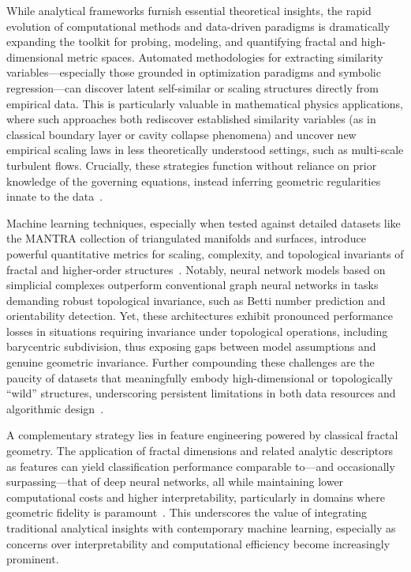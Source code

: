 While analytical frameworks furnish essential theoretical insights, the rapid evolution of computational methods and data-driven paradigms is dramatically expanding the toolkit for probing, modeling, and quantifying fractal and high-dimensional metric spaces. Automated methodologies for extracting similarity variables—especially those grounded in optimization paradigms and symbolic regression—can discover latent self-similar or scaling structures directly from empirical data. This is particularly valuable in mathematical physics applications, where such approaches both rediscover established similarity variables (as in classical boundary layer or cavity collapse phenomena) and uncover new empirical scaling laws in less theoretically understood settings, such as multi-scale turbulent flows. Crucially, these strategies function without reliance on prior knowledge of the governing equations, instead inferring geometric regularities innate to the data~\cite{ref65}.

Machine learning techniques, especially when tested against detailed datasets like the MANTRA collection of triangulated manifolds and surfaces, introduce powerful quantitative metrics for scaling, complexity, and topological invariants of fractal and higher-order structures~\cite{ref26,ref39}. Notably, neural network models based on simplicial complexes outperform conventional graph neural networks in tasks demanding robust topological invariance, such as Betti number prediction and orientability detection. Yet, these architectures exhibit pronounced performance losses in situations requiring invariance under topological operations, including barycentric subdivision, thus exposing gaps between model assumptions and genuine geometric invariance. Further compounding these challenges are the paucity of datasets that meaningfully embody high-dimensional or topologically ``wild'' structures, underscoring persistent limitations in both data resources and algorithmic design~\cite{ref39}.

A complementary strategy lies in feature engineering powered by classical fractal geometry. The application of fractal dimensions and related analytic descriptors as features can yield classification performance comparable to—and occasionally surpassing—that of deep neural networks, all while maintaining lower computational costs and higher interpretability, particularly in domains where geometric fidelity is paramount~\cite{ref26}. This underscores the value of integrating traditional analytical insights with contemporary machine learning, especially as concerns over interpretability and computational efficiency become increasingly prominent.

